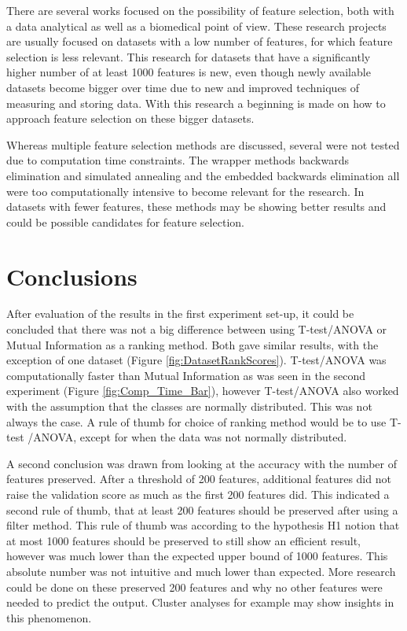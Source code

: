 \documentclass[10pt,a4paper]{report}
\begin{document}
	There are several works focused on the possibility of feature selection, both with a data analytical \cite{catal2009investigating} as well as a biomedical \cite{baumgartner2006data, welthagen2005comprehensive, liu2002comparative} point of view. These research projects are usually focused on datasets with a low number of features, for which feature selection is less relevant. This research for datasets that have a significantly higher number of at least 1000 features is new, even though newly available datasets become bigger over time due to new and improved techniques of measuring and storing data. With this research a beginning is made on how to approach feature selection on these bigger datasets.
	
	Whereas multiple feature selection methods are discussed, several were not tested due to computation time constraints. The wrapper methods backwards elimination and simulated annealing and the embedded backwards elimination all were too computationally intensive to become relevant for the research. In datasets with fewer features, these methods may be showing better results and could be possible candidates for feature selection.
	
	
	\section{Conclusions}	
	\label{FSsec:Conclusions}
	
	After evaluation of the results in the first experiment set-up, it could be concluded that there was not a big difference between using T-test/ANOVA or Mutual Information as a ranking method. Both gave similar results, with the exception of one dataset (Figure \ref{fig:DatasetRankScores}). T-test/ANOVA was computationally faster than Mutual Information as was seen in the second experiment (Figure \ref{fig:Comp_Time_Bar}), however T-test/ANOVA also worked with the assumption that the classes are normally distributed. This was not always the case. A rule of thumb for choice of ranking method would be to use T-test /ANOVA, except for when the data was not normally distributed. %
	
	A second conclusion was drawn from looking at the accuracy with the number of features preserved. After a threshold of 200 features, additional features did not raise the validation score as much as the first 200 features did. This indicated a second rule of thumb, that at least 200 features should be preserved after using a filter method. This rule of thumb was according to the hypothesis H1 notion that at most 1000 features should be preserved to still show an efficient result, however was much lower than the expected upper bound of 1000 features. This absolute number was not intuitive and much lower than expected. More research could be done on these preserved 200 features and why no other features were needed to predict the output. Cluster analyses for example may show insights in this phenomenon.
	
\end{document}

